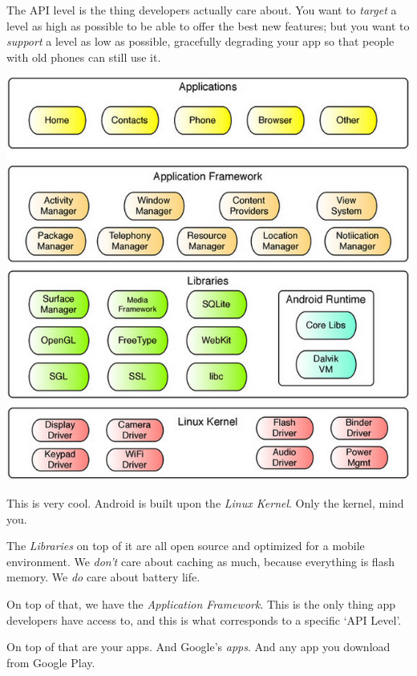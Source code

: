 \documentclass[a4paper,slides=slides,handouts=handouts]{mh-presentation}       %
\begin{document}
	\begin{summary}
		The API level is the thing developers actually care about. You want to
		\emph{target} a level as high as possible to be able to offer the best new
		features; but you want to \emph{support} a level as low as possible, gracefully
		degrading your app so that people with old phones can still use it.
	\end{summary}
	
	\begin{slide}
		\includegraphics[scale=.28]{androidstack.png}
	\end{slide}
	
	\begin{summary}
		This is very cool. Android is built upon the \emph{Linux Kernel}. Only the kernel,
		mind you.
		
		The \emph{Libraries} on top of it are all open source and optimized for a mobile
		environment. We \emph{don't} care about caching as much, because everything is
		flash memory. We \emph{do} care about battery life.
		
		On top of that, we have the \emph{Application Framework}. This is the only thing app
		developers have access to, and this is what corresponds to a specific `API Level'.
		
		On top of that are your apps. And Google's \emph{apps}. And any app you download
		from Google Play.
	\end{summary}
	
\end{document}
